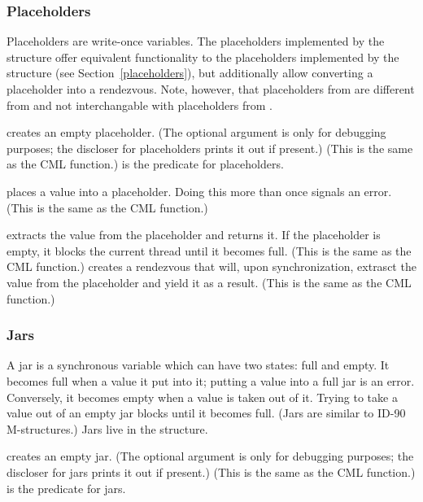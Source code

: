 \subsubsection{Placeholders}
%
Placeholders are write-once variables.  The placeholders implemented
by the  structure offer equivalent
functionality to the placeholders implemented by the
 structure (see Section~\ref{placeholders}), but
additionally allow converting a placeholder into a rendezvous.  Note,
however, that placeholders from  are different from
and not interchangable with placeholders from
.
%
\begin{protos}
\end{protos}
%
 creates an empty placeholder.  (The optional
 argument is only for debugging purposes; the discloser for
placeholders prints it out if present.)  (This is the same as the CML
 function.)   is the predicate for
placeholders.
%
\begin{protos}
\end{protos}
%
 places a value into a placeholder.  Doing this
more than once signals an error.  (This is the same as the CML
 function.)
%
\begin{protos}
\end{protos}
%
 extracts the value from the placeholder and
returns it.  If the placeholder is empty, it blocks the current thread
until it becomes full.  (This is the same as the CML 
function.)   creates a rendezvous that
will, upon synchronization, extrasct the value from the placeholder
and yield it as a result.  (This is the same as the CML 
function.)

\subsubsection{Jars}

A jar is a synchronous variable which can have two states: full and
empty.  It becomes full when a value it put into it; putting a value
into a full jar is an error.  Conversely, it becomes empty when a
value is taken out of it.  Trying to take a value out of an empty jar
blocks until it becomes full.  (Jars are similar to ID-90
M-structures.)  Jars live in the  structure.
%
\begin{protos}
\end{protos}
%
 creates an empty jar.  (The optional 
argument is only for debugging purposes; the discloser for jars prints
it out if present.)  (This is the same as the CML 
function.)   is the predicate for jars.

